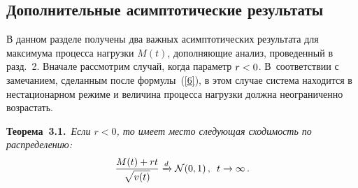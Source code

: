 \begin{multicols}{2}
\section{Дополнительные асимптотические результаты}

В данном разделе получены два важных асимптотических результата для
максимума процесса нагрузки $M(t)$, дополняющие анализ, проведенный
в разд.~2. Вначале рассмотрим случай, когда параметр
$r\hm<0$. В~соответствии с замечанием, сделанным  после формулы~(\ref{6}), 
в этом случае система находится в   нестационарном режиме
и величина процесса нагрузки должна неограниченно воз\-рас\-тать.


\medskip

\noindent
\textbf{Теорема~3.1.}\ \textit{Если $r<0$, то имеет место следующая сходимость 
по распределению:}
\begin{equation}
\displaystyle\frac{\displaystyle M(t)+rt\mathstrut}{\displaystyle \sqrt{v(t)}\mathstrut}  \xrightarrow{d} \mathcal{N}
(0,1)\,, \enskip t \to \infty\,.
\label{max-l1}
\end{equation}



\end{multicols}
